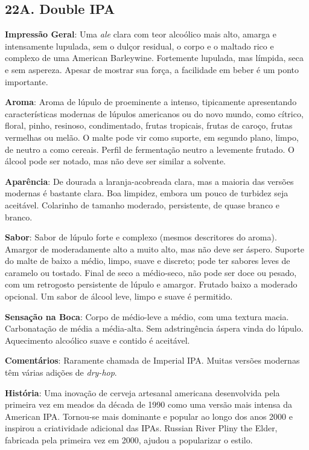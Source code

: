 \subsection*{22A. Double IPA}
\textbf{Impressão Geral}: Uma \textit{ale} clara com teor alcoólico mais alto, amarga e intensamente lupulada, sem o dulçor residual, o corpo e o maltado rico e complexo de uma American Barleywine. Fortemente lupulada, mas límpida, seca e sem aspereza. Apesar de mostrar sua força, a facilidade em beber é um ponto importante.

\textbf{Aroma}: Aroma de lúpulo de proeminente a intenso, tipicamente apresentando características modernas de lúpulos americanos ou do novo mundo, como cítrico, floral, pinho, resinoso, condimentado, frutas tropicais, frutas de caroço, frutas vermelhas ou melão. O malte pode vir como suporte, em segundo plano, limpo, de neutro a como cereais. Perfil de fermentação neutro a levemente frutado. O álcool pode ser notado, mas não deve ser similar a solvente.

\textbf{Aparência}: De dourada a laranja-acobreada clara, mas a maioria das versões modernas é bastante clara. Boa limpidez, embora um pouco de turbidez seja aceitável. Colarinho de tamanho moderado, persistente, de quase branco e branco.

\textbf{Sabor}: Sabor de lúpulo forte e complexo (mesmos descritores do aroma). Amargor de moderadamente alto a muito alto, mas não deve ser áspero. Suporte do malte de baixo a médio, limpo, suave e discreto; pode ter sabores leves de caramelo ou tostado. Final de seco a médio-seco, não pode ser doce ou pesado, com um retrogosto persistente de lúpulo e amargor. Frutado baixo a moderado opcional. Um sabor de álcool leve, limpo e suave é permitido.

\textbf{Sensação na Boca}: Corpo de médio-leve a médio, com uma textura macia. Carbonatação de média a média-alta. Sem adstringência áspera vinda do lúpulo. Aquecimento alcoólico suave e contido é aceitável.

\textbf{Comentários}: Raramente chamada de Imperial IPA. Muitas versões modernas têm várias adições de \textit{dry-hop}.

\textbf{História}: Uma inovação de cerveja artesanal americana desenvolvida pela primeira vez em meados da década de 1990 como uma versão mais intensa da American IPA. Tornou-se mais dominante e popular ao longo dos anos 2000 e inspirou a criatividade adicional das IPAs. Russian River Pliny the Elder, fabricada pela primeira vez em 2000, ajudou a popularizar o estilo.

